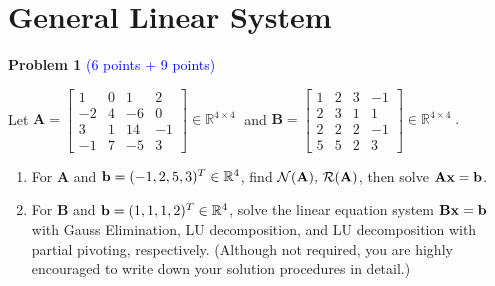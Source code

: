 \documentclass[english,onecolumn]{IEEEtran}
\begin{document}
\newpage 
\section{General Linear System}
\noindent\textbf{Problem 1}   \textcolor{blue}{(6 points + 9 points)}
\vspace*{3mm}

\noindent Let $\mathbf{A} = \begin{bmatrix}
	1 & 0 & 1 & 2\\
	-2 & 4 & -6 & 0\\
	3 & 1 & 14 & -1\\
	-1 & 7 & -5 & 3
	\end{bmatrix} \in\mathbb{R}^{4\times 4}\;$ and
	$\mathbf{B} = \begin{bmatrix}
	1 & 2 & 3 & -1\\
	2 & 3 & 1 & 1\\
	2 & 2 & 2 & -1\\
	5 & 5 & 2 & 3
	\end{bmatrix} \in\mathbb{R}^{4\times 4}\;.$
\begin{enumerate}
	\item 
	For {\bf A} and ${\bf b} = (-1,2,5,3)^T\in \mathbb{R}^4$, 
	find $\mathcal{N}({\bf A}),\, \mathcal{R}({\bf A})$, then solve ${\bf Ax} = {\bf b}$.
	\item 
	For {\bf B} and 
	${\bf b} = (1,1,1,2)^T \in \mathbb{R}^4$, solve the linear equation system ${\bf Bx} = {\bf b}$ 
	with Gauss Elimination, LU decomposition, and LU decomposition with partial pivoting, respectively. (Although not required, you are highly encouraged to write down your solution procedures in detail.)
\end{enumerate}
\end{document}
